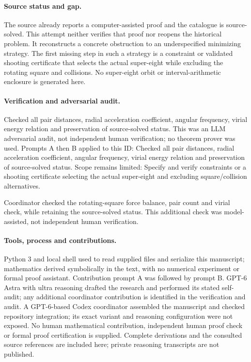 \documentclass[11pt]{article}
\begin{document}
\paragraph{Source status and gap.}The source already reports a computer-assisted proof and the catalogue is source-solved. This attempt neither verifies that proof nor reopens the historical problem. It reconstructs a concrete obstruction to an underspecified minimizing strategy. The first missing step in such a strategy is a constraint or validated shooting certificate that selects the actual super-eight while excluding the rotating square and collisions. No super-eight orbit or interval-arithmetic enclosure is generated here.

\paragraph{Verification and adversarial audit.}
Checked all pair distances, radial acceleration coefficient, angular frequency, virial energy relation and preservation of source-solved status. This was an LLM adversarial audit, not independent human verification; no theorem prover was used. Prompts A then B applied to this ID: Checked all pair distances, radial acceleration coefficient, angular frequency, virial energy relation and preservation of source-solved status. Scope remains limited: Specify and verify constraints or a shooting certificate selecting the actual super-eight and excluding square/collision alternatives.

Coordinator checked the rotating-square force balance, pair count and virial check, while retaining the source-solved status. This additional check was model-assisted, not independent human verification.

\paragraph{Tools, process and contributions.}
Python 3 and local shell used to read supplied files and serialize this manuscript; mathematics derived symbolically in the text, with no numerical experiment or formal proof assistant. Contribution prompt A was followed by prompt B. GPT-6 Astra with ultra reasoning drafted the research and performed its stated self-audit; any additional coordinator contribution is identified in the verification and audit. A GPT-6-based Codex coordinator assembled the manuscript and checked repository integration; its exact variant and reasoning configuration were not exposed. No human mathematical contribution, independent human proof check or formal proof certification is supplied. Complete derivations and the consulted source references are included here; private reasoning transcripts are not published.
\end{document}
